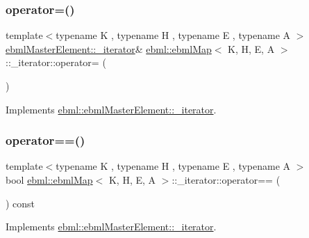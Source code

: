 \subsubsection{\texorpdfstring{operator=()}{operator=()}}
{\footnotesize\ttfamily template$<$typename K , typename H , typename E , typename A $>$ \\
\mbox{\hyperlink{classebml_1_1ebmlMasterElement_1_1__iterator}{ebml\+Master\+Element\+::\+\_\+iterator}}\& \mbox{\hyperlink{classebml_1_1ebmlMap}{ebml\+::ebml\+Map}}$<$ K, H, E, A $>$\+::\+\_\+iterator\+::operator= (\begin{DoxyParamCaption}\item[{const \mbox{\hyperlink{classebml_1_1ebmlMasterElement_1_1__iterator}{ebml\+Master\+Element\+::\+\_\+iterator}} \&}]{ }\end{DoxyParamCaption})\hspace{0.3cm}{\ttfamily [virtual]}}



Implements \mbox{\hyperlink{classebml_1_1ebmlMasterElement_1_1__iterator_a849c5027957fa1a022de0417aea1ad9e}{ebml\+::ebml\+Master\+Element\+::\+\_\+iterator}}.

\mbox{\label{classebml_1_1ebmlMap_1_1__iterator_abda291b4e2305234d8215d4a3b03e7a5}} 
\subsubsection{\texorpdfstring{operator==()}{operator==()}}
{\footnotesize\ttfamily template$<$typename K , typename H , typename E , typename A $>$ \\
bool \mbox{\hyperlink{classebml_1_1ebmlMap}{ebml\+::ebml\+Map}}$<$ K, H, E, A $>$\+::\+\_\+iterator\+::operator== (\begin{DoxyParamCaption}\item[{const \mbox{\hyperlink{classebml_1_1ebmlMasterElement_1_1__iterator}{ebml\+Master\+Element\+::\+\_\+iterator}} \&}]{ }\end{DoxyParamCaption}) const\hspace{0.3cm}{\ttfamily [virtual]}}



Implements \mbox{\hyperlink{classebml_1_1ebmlMasterElement_1_1__iterator_ab0b53665f686e2ae379b275110ea3c95}{ebml\+::ebml\+Master\+Element\+::\+\_\+iterator}}.



